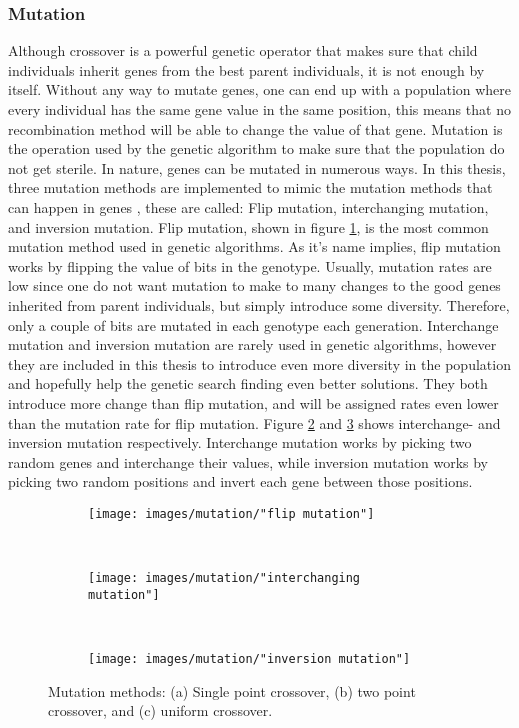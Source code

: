 \subsubsection{Mutation}
Although crossover is a powerful genetic operator that makes sure that child individuals inherit genes from the best parent individuals, it is not enough by itself. Without any way to mutate genes, one can end up with a population where every individual has the same gene value in the same position, this means that no recombination method will be able to change the value of that gene. Mutation is the operation used by the genetic algorithm to make sure that the population do not get sterile. In nature, genes can be mutated in numerous ways. In this thesis, three mutation methods are implemented to mimic the mutation methods that can happen in genes \citep{Soni}, these are called: Flip mutation, interchanging mutation, and inversion mutation. Flip mutation, shown in figure \ref{figure:flip mutation}, is the most common mutation method used in genetic algorithms. As it's name implies, flip mutation works by flipping the value of bits in the genotype. Usually, mutation rates are low since one do not want mutation to make to many changes to the good genes inherited from parent individuals, but simply introduce some diversity. Therefore, only a couple of bits are mutated in each genotype each generation. Interchange mutation and inversion mutation are rarely used in genetic algorithms, however they are included in this thesis to introduce even more diversity in the population and hopefully help the genetic search finding even better solutions. They both introduce more change than flip mutation, and will be assigned rates even lower than the mutation rate for flip mutation. Figure \ref{figure:interchange mutation} and \ref{figure:inversion mutation} shows interchange- and inversion mutation respectively. Interchange mutation works by picking two random genes and interchange their values, while inversion mutation works by picking two random positions and invert each gene between those positions. 


\begin{figure}[h!]
    \centering
    \begin{subfigure}[b]{0.3\textwidth}
        \texttt{[image: images/mutation/"flip mutation"]}
        \caption{}
        \label{figure:flip mutation}
    \end{subfigure}
    ~ 
    \begin{subfigure}[b]{0.3\textwidth}
        \texttt{[image: images/mutation/"interchanging mutation"]}
        \caption{}
        \label{figure:interchange mutation}
    \end{subfigure}
    ~
    \begin{subfigure}[b]{0.3\textwidth}
        \texttt{[image: images/mutation/"inversion mutation"]}
        \caption{}
        \label{figure:inversion mutation}
    \end{subfigure}
    \caption{Mutation methods: (a) Single point crossover, (b) two point crossover, and (c) uniform crossover.}
    \label{figure:mutation methods}
\end{figure}



